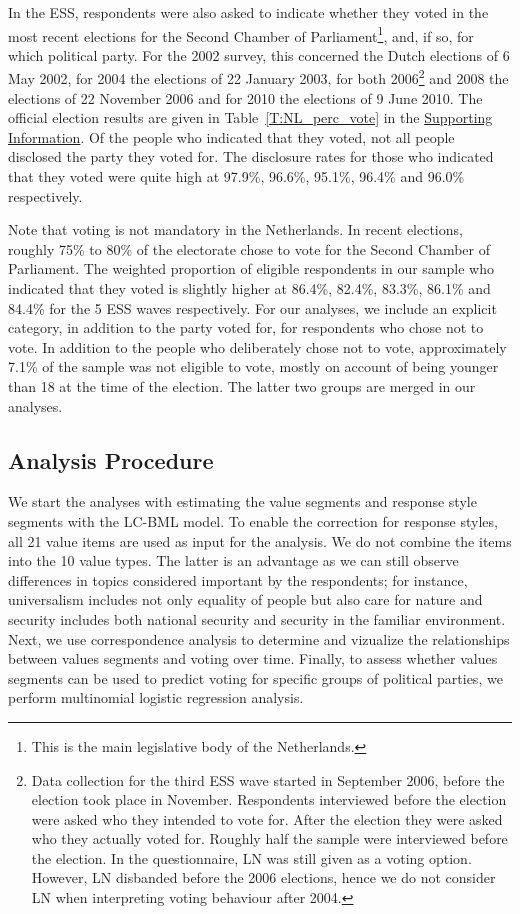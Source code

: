 \documentclass[12pt,letter]{article}\usepackage[]{graphicx}\usepackage[]{xcolor}
\begin{document}
In the ESS, respondents were also asked to indicate whether they voted in the most recent elections for the Second Chamber of Parliament\footnote{This is the main legislative body of the Netherlands.}, and, if so, for which political party. For the 2002 survey, this concerned the Dutch elections of 6 May 2002, for 2004 the elections of 22 January 2003, for both 2006\footnote{Data collection for the third ESS wave started in September 2006, before the election took place in November. Respondents interviewed before the election were asked who they intended to vote for. After the election they were asked who they actually voted for. Roughly half the sample were interviewed before the election. In the questionnaire, LN was still given as a voting option. However, LN disbanded before the 2006 elections, hence we do not consider LN when interpreting voting behaviour after 2004.} and 2008 the elections of 22 November 2006 and for 2010 the elections of 9 June 2010. The official election results are given in Table~\ref{T:NL_perc_vote} in the \hyperref[S:App]{Supporting Information}. Of the people who indicated that they voted, not all people disclosed the party they voted for. The disclosure rates for those who indicated that they voted were quite high at 97.9\%, 96.6\%, 95.1\%, 96.4\% and 96.0\% respectively. 

Note that voting is not mandatory in the Netherlands. In recent elections, roughly 75\% to 80\% of the electorate chose to vote for the Second Chamber of Parliament. The weighted proportion of eligible respondents in our sample who indicated that they voted is slightly higher at 86.4\%, 82.4\%, 83.3\%, 86.1\% and  84.4\% for the 5 ESS waves respectively. For our analyses, we include an explicit category, in addition to the party voted for, for respondents who chose not to vote. In addition to the people who deliberately chose not to vote, approximately 7.1\% of the sample was not eligible to vote, mostly on account of being younger than 18 at the time of the election. The latter two groups are merged in our analyses. 

\subsection*{Analysis Procedure}

We start the analyses with estimating the value segments and response style segments with the LC-BML model. To enable the correction for response styles, all 21 value items are used as input for the analysis. We do not combine the items into the 10 value types. The latter is an advantage as we can still observe differences in topics considered important by the respondents; for instance, universalism includes not only equality of people but also care for nature and security includes both national security and security in the familiar environment. Next, we use correspondence analysis to determine and vizualize the relationships between values segments and voting over time. Finally, to assess whether values segments can be used to predict voting for specific groups of political parties, we perform multinomial logistic regression analysis.
\end{document}
